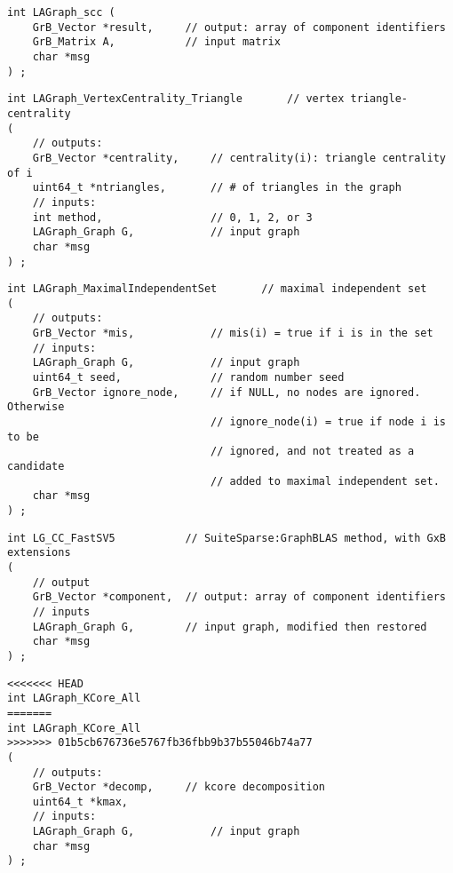 \begin{verbatim}
int LAGraph_scc (
    GrB_Vector *result,     // output: array of component identifiers
    GrB_Matrix A,           // input matrix
    char *msg
) ;
\end{verbatim}




\begin{verbatim}
int LAGraph_VertexCentrality_Triangle       // vertex triangle-centrality
(
    // outputs:
    GrB_Vector *centrality,     // centrality(i): triangle centrality of i
    uint64_t *ntriangles,       // # of triangles in the graph
    // inputs:
    int method,                 // 0, 1, 2, or 3
    LAGraph_Graph G,            // input graph
    char *msg
) ;
\end{verbatim}




\begin{verbatim}
int LAGraph_MaximalIndependentSet       // maximal independent set
(
    // outputs:
    GrB_Vector *mis,            // mis(i) = true if i is in the set
    // inputs:
    LAGraph_Graph G,            // input graph
    uint64_t seed,              // random number seed
    GrB_Vector ignore_node,     // if NULL, no nodes are ignored.  Otherwise
                                // ignore_node(i) = true if node i is to be
                                // ignored, and not treated as a candidate
                                // added to maximal independent set.
    char *msg
) ;
\end{verbatim}




\begin{verbatim}
int LG_CC_FastSV5           // SuiteSparse:GraphBLAS method, with GxB extensions
(
    // output
    GrB_Vector *component,  // output: array of component identifiers
    // inputs
    LAGraph_Graph G,        // input graph, modified then restored
    char *msg
) ;
\end{verbatim}




\begin{verbatim}
<<<<<<< HEAD
int LAGraph_KCore_All       
=======
int LAGraph_KCore_All
>>>>>>> 01b5cb676736e5767fb36fbb9b37b55046b74a77
(
    // outputs:
    GrB_Vector *decomp,     // kcore decomposition
    uint64_t *kmax,
    // inputs:
    LAGraph_Graph G,            // input graph
    char *msg
) ;
\end{verbatim}




